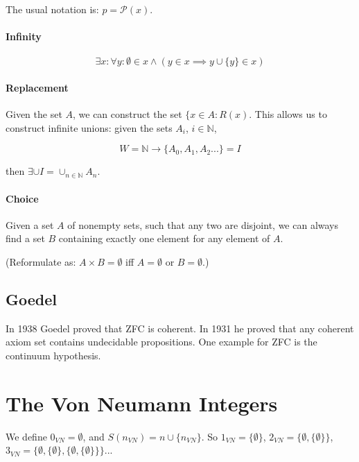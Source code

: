\documentclass[12pt,a4paper]{report}
\numberwithin{equation}{section}
\theoremstyle{definition}
\theoremstyle{remark}
\begin{document}
The usual notation is: $p = \mathcal{P}(x)$.

\paragraph{Infinity}

\begin{equation}
\exists x: \forall y: \emptyset \in x \wedge (y \in x \implies y \cup \lbrace y \rbrace \in x )
\end{equation}

\paragraph{Replacement}

Given the set $A$, we can construct the set $\lbrace x \in A : R(x)$. This allows us to construct infinite unions: given the sets $A_i$, $i \in \mathbb{N}$,

\begin{equation}
W = \mathbb{N} \rightarrow \lbrace A_0, A_1, A_2 ...\rbrace = I
\end{equation}

then $\exists \cup I = \cup _{n \in \mathbb{N}} A_n$.

\paragraph{Choice}

Given a set $A$ of nonempty sets, such that any two are disjoint, we can always find a set $B$ containing exactly one element for any element of $A$.

(Reformulate as: $A\times B =\emptyset$ iff $A= \emptyset$ or $B =\emptyset$.)

\subsection{Goedel}

In 1938 Goedel proved that ZFC is coherent. In 1931 he proved that any coherent axiom set contains undecidable propositions. One example for ZFC is the continuum hypothesis.

\section{The Von Neumann Integers}

We define $0_{VN} = \emptyset$, and $S(n_{VN}) =n \cup \lbrace n_{VN} \rbrace$. So $1_{VN} = \lbrace \emptyset \rbrace$, $2_{VN} = \lbrace \emptyset , \lbrace \emptyset \rbrace \rbrace$, $3_{VN} = \lbrace \emptyset , \lbrace \emptyset \rbrace , \lbrace \emptyset , \lbrace \emptyset \rbrace \rbrace \rbrace$...
\end{document}
